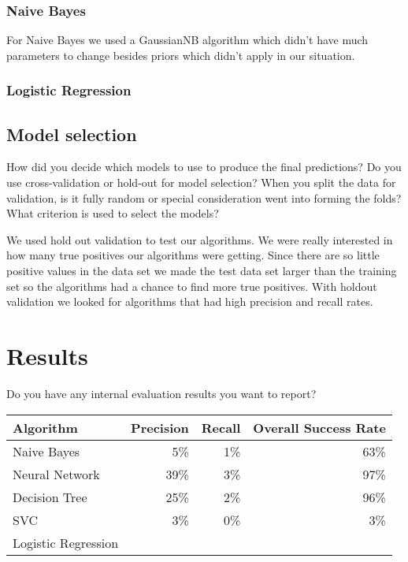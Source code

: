 \documentclass[11pt,a4paper]{article}
\begin{document}
		\subsubsection{Naive Bayes}
			For Naive Bayes we used a GaussianNB algorithm which didn't have much parameters to change besides priors which didn't apply in our situation.

		\subsubsection{Logistic Regression}
			

	\subsection{Model selection}
		How did you decide which models to use to produce the final predictions? 
		Do you use cross-validation or hold-out for model selection?
		When you split the data for validation, is it fully random or special consideration went into forming the folds?
		What criterion is used to select the models?

		We used hold out validation to test our algorithms.
		We were really interested in how many true positives our algorithms were getting.
		Since there are so little positive values in the data set we made the test data set larger than the training set so the algorithms had a chance to find more true positives.
		With holdout validation we looked for algorithms that had high precision and recall rates.

\section{Results}
	Do you have any internal evaluation results you want to report?

	\begin{tabular}{ | l | r | r | r | }
		\hline
		Algorithm & Precision & Recall & Overall Success Rate \\
		\hline
		Naive Bayes & 5\% & 1\% & 63\% \\
		\hline
		Neural Network & 39\% & 3\% & 97\% \\
		\hline
		Decision Tree & 25\% & 2\% & 96\% \\
		\hline
		SVC & 3\% & 0\% & 3\% \\
		\hline
		Logistic Regression & & & \\
		\hline
	\end{tabular}
\end{document}
